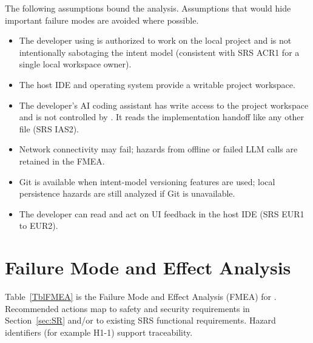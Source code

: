 \documentclass{article}
\begin{document}
The following assumptions bound the analysis. Assumptions that would hide
important failure modes are avoided where possible.

\begin{itemize}
  \item The developer using \progname{} is authorized to work on the local
  project and is not intentionally sabotaging the intent model
  (consistent with SRS ACR1 for a single local workspace owner).
  \item The host IDE and operating system provide a writable project workspace.
  \item The developer's AI coding assistant has write access to the project
  workspace and is not controlled by \progname{}. It reads the implementation
  handoff like any other file (SRS IAS2).
  \item Network connectivity may fail; hazards from offline or failed LLM
  calls are retained in the FMEA.
  \item Git is available when intent-model versioning features are used; local
  persistence hazards are still analyzed if Git is unavailable.
  \item The developer can read and act on UI feedback in the host IDE
  (SRS EUR1 to EUR2).
\end{itemize}

\section{Failure Mode and Effect Analysis}

Table~\ref{TblFMEA} is the Failure Mode and Effect Analysis (FMEA) for
\progname{}. Recommended actions map to safety and security requirements in
Section~\ref{sec:SR} and/or to existing SRS functional requirements. Hazard
identifiers (for example H1-1) support traceability.
\end{document}
